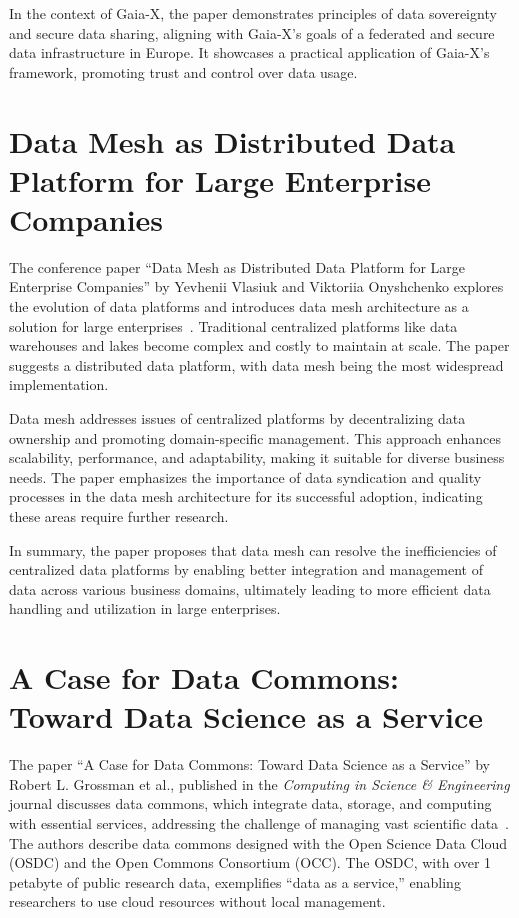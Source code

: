 In the context of Gaia-X, the paper demonstrates principles of data sovereignty and secure data sharing, aligning with Gaia-X's goals of a federated and secure data infrastructure in Europe.
It showcases a practical application of Gaia-X's framework, promoting trust and control over data usage.

\section{Data Mesh as Distributed Data Platform for Large Enterprise Companies}\label{sec:data-mesh-as-distributed-data-platform-for-large-enterprise-companies}

The conference paper ``Data Mesh as Distributed Data Platform for Large Enterprise Companies'' by Yevhenii Vlasiuk and Viktoriia Onyshchenko explores the evolution of data platforms and introduces data mesh architecture as a solution for large enterprises~\cite{data_mesh}.
Traditional centralized platforms like data warehouses and lakes become complex and costly to maintain at scale.
The paper suggests a distributed data platform, with data mesh being the most widespread implementation.

Data mesh addresses issues of centralized platforms by decentralizing data ownership and promoting domain-specific management.
This approach enhances scalability, performance, and adaptability, making it suitable for diverse business needs.
The paper emphasizes the importance of data syndication and quality processes in the data mesh architecture for its successful adoption, indicating these areas require further research.

In summary, the paper proposes that data mesh can resolve the inefficiencies of centralized data platforms by enabling better integration and management of data across various business domains, ultimately leading to more efficient data handling and utilization in large enterprises.

\section{A Case for Data Commons: Toward Data Science as a Service}\label{sec:a-case-for-data-commons:-toward-data-science-as-a-service}

The paper ``A Case for Data Commons: Toward Data Science as a Service'' by Robert L. Grossman et al., published in the \textit{Computing in Science \& Engineering} journal discusses data commons, which integrate data, storage, and computing with essential services, addressing the challenge of managing vast scientific data~\cite{towards_ds_as_a_service}.
The authors describe data commons designed with the Open Science Data Cloud (OSDC) and the Open Commons Consortium (OCC). The OSDC, with over 1 petabyte of public research data, exemplifies ``data as a service,'' enabling researchers to use cloud resources without local management.

